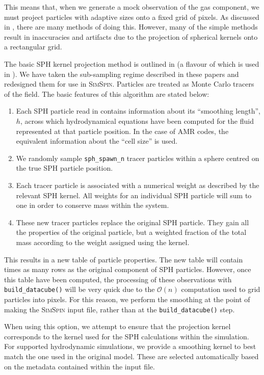 \documentclass[
  journal=pasa,
  manuscript=research-paper, %
  year=2020,
  volume=37,
]{cup-journal}
\newcommand{\simspin}[1]{\textsc{SimSpin}#1} %
\newcommand{\builddatacube}[1]{\texttt{build\_datacube()}#1}
\begin{document}
This means that, when we generate a mock observation of the gas component, we must project particles with adaptive sizes onto a fixed grid of pixels. 
As discussed in \citealt{Borrow2021ProjectingEnvironments}, there are many methods of doing this.
However, many of the simple methods result in inaccuracies and artifacts due to the projection of spherical kernels onto a rectangular grid.

The basic SPH kernel projection method is outlined in \citealt{Borrow2021ProjectingEnvironments} (a flavour of which is used in \citealt{Dolag2005ThePlanck}).
We have taken the sub-sampling regime described in these papers and redesigned them for use in \simspin{}. 
Particles are treated as Monte Carlo tracers of the field. 
The basic features of this algorithm are stated below:

\begin{enumerate}
    \item Each SPH particle read in contains information about its ``smoothing length'', $h$, across which hydrodynamical equations have been computed for the fluid represented at that particle position. In the case of AMR codes, the equivalent information about the ``cell size'' is used. 
    \item We randomly sample \texttt{sph\_spawn\_n} tracer particles within a sphere centred on the true SPH particle position. 
    \item Each tracer particle is associated with a numerical weight as described by the relevant SPH kernel. 
    All weights for an individual SPH particle will sum to one in order to conserve mass within the system.
    \item These new tracer particles replace the original SPH particle. 
    They gain all the properties of the original particle, but a weighted fraction of the total mass according to the weight assigned using the kernel. 
\end{enumerate}

This results in a new table of particle properties. 
The new table will contain  times as many rows as the original component of SPH particles. 
However, once this table have been computed, the processing of these observations with \builddatacube{} will be very quick due to the $\mathcal{O}(n)$ computation used to grid particles into pixels. 
For this reason, we perform the smoothing at the point of making the \simspin{} input file, rather than at the \builddatacube{} step. 

When using this option, we attempt to ensure that the projection kernel corresponds to the kernel used for the SPH calculations within the simulation. 
For supported hydrodynamic simulations, we provide a smoothing kernel to best match the one used in the original model.
These are selected automatically based on the metadata contained within the input file. 
\end{document}
